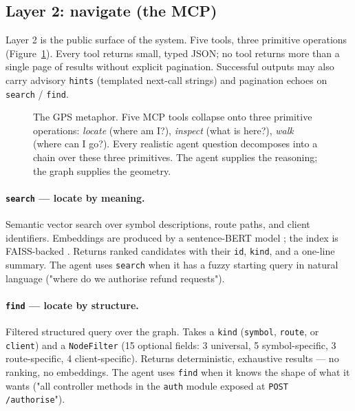 \documentclass[11pt,a4paper]{article}
\begin{document}
\subsection{Layer 2: navigate (the MCP)}
\label{sec:layer2}

Layer 2 is the public surface of the system. Five tools, three primitive operations (Figure~\ref{fig:gps}). Every tool returns small, typed JSON; no tool returns more than a single page of results without explicit pagination. Successful outputs may also carry advisory \texttt{hints} (templated next-call strings) and pagination echoes on \texttt{search} / \texttt{find}.

\begin{figure}[H]
\centering

\caption{The GPS metaphor. Five MCP tools collapse onto three primitive operations: \emph{locate} (where am I?), \emph{inspect} (what is here?), \emph{walk} (where can I go?). Every realistic agent question decomposes into a chain over these three primitives. The agent supplies the reasoning; the graph supplies the geometry.}
\label{fig:gps}
\end{figure}

\paragraph{\texttt{search} --- locate by meaning.} Semantic vector search over symbol descriptions, route paths, and client identifiers. Embeddings are produced by a sentence-BERT model \cite{reimers2019sbert}; the index is FAISS-backed \cite{johnson2019billion}. Returns ranked candidates with their \texttt{id}, \texttt{kind}, and a one-line summary. The agent uses \texttt{search} when it has a fuzzy starting query in natural language ("where do we authorise refund requests").

\paragraph{\texttt{find} --- locate by structure.} Filtered structured query over the graph. Takes a \texttt{kind} (\texttt{symbol}, \texttt{route}, or \texttt{client}) and a \texttt{NodeFilter} (15 optional fields: 3 universal, 5 symbol-specific, 3 route-specific, 4 client-specific). Returns deterministic, exhaustive results --- no ranking, no embeddings. The agent uses \texttt{find} when it knows the shape of what it wants ("all controller methods in the \texttt{auth} module exposed at \texttt{POST /authorise}").
\end{document}
